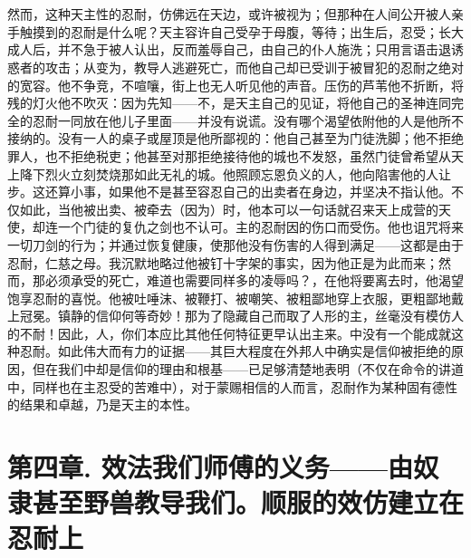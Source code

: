 
\section{}

然而，这种天主性的忍耐，仿佛远在天边，或许被视为；但那种在人间公开被人亲手触摸到的忍耐是什么呢？天主容许自己受孕于母腹，等待；出生后，忍受；长大成人后，并不急于被人认出，反而羞辱自己，由自己的仆人施洗；只用言语击退诱惑者的攻击；从变为，教导人逃避死亡，而他自己却已受训于被冒犯的忍耐之绝对的宽容。他不争竞，不喧嚷，街上也无人听见他的声音。压伤的芦苇他不折断，将残的灯火他不吹灭：因为先知——不，是天主自己的见证，将他自己的圣神连同完全的忍耐一同放在他儿子里面——并没有说谎。没有哪个渴望依附他的人是他所不接纳的。没有一人的桌子或屋顶是他所鄙视的：他自己甚至为门徒洗脚；他不拒绝罪人，也不拒绝税吏；他甚至对那拒绝接待他的城也不发怒，虽然门徒曾希望从天上降下烈火立刻焚烧那如此无礼的城。他照顾忘恩负义的人，他向陷害他的人让步。这还算小事，如果他不是甚至容忍自己的出卖者在身边，并坚决不指认他。不仅如此，当他被出卖、被牵去（因为）时，他本可以一句话就召来天上成营的天使，却连一个门徒的复仇之剑也不认可。主的忍耐因的伤口而受伤。他也诅咒将来一切刀剑的行为；并通过恢复健康，使那他没有伤害的人得到满足——这都是由于忍耐，仁慈之母。我沉默地略过他被钉十字架的事实，因为他正是为此而来；然而，那必须承受的死亡，难道也需要同样多的凌辱吗？，在他将要离去时，他渴望饱享忍耐的喜悦。他被吐唾沫、被鞭打、被嘲笑、被粗鄙地穿上衣服，更粗鄙地戴上冠冕。镇静的信仰何等奇妙！那为了隐藏自己而取了人形的主，丝毫没有模仿人的不耐！因此，人，你们本应比其他任何特征更早认出主来。中没有一个能成就这种忍耐。如此伟大而有力的证据——其巨大程度在外邦人中确实是信仰被拒绝的原因，但在我们中却是信仰的理由和根基——已足够清楚地表明（不仅在命令的讲道中，同样也在主忍受的苦难中），对于蒙赐相信的人而言，忍耐作为某种固有德性的结果和卓越，乃是天主的本性。\par


\section{第四章. 效法我们师傅的义务——由奴隶甚至野兽教导我们。顺服的效仿建立在忍耐上}

